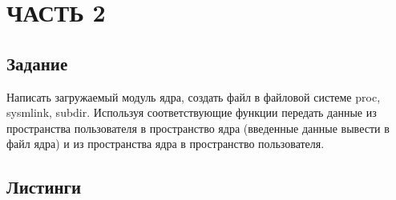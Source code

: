 \section{ЧАСТЬ 2}

\subsection{Задание}

Написать загружаемый модуль ядра, создать файл в файловой
системе {\ttfamily proc}, {\ttfamily sysmlink},
{\ttfamily subdir}. Используя соответствующие
функции передать данные из пространства пользователя в
пространство ядра (введенные данные вывести в файл ядра)
и из пространства ядра в пространство пользователя.

\subsection{Листинги}

